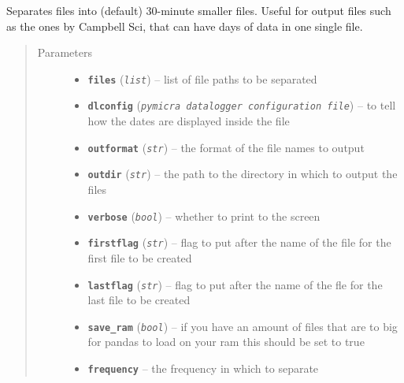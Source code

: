 \documentclass[a4paper,10pt,oneside]{sphinxmanual}
\begin{document}
\begin{fulllineitems}
\label{pymicra:pymicra.util.separateFiles}
Separates files into (default) 30-minute smaller files. Useful for output files such
as the ones by Campbell Sci, that can have days of data in one single file.
\begin{quote}\begin{description}
\item[{Parameters}] \leavevmode\begin{itemize}
\item {} 
\textbf{\texttt{files}} (\emph{\texttt{list}}) -- list of file paths to be separated

\item {} 
\textbf{\texttt{dlconfig}} (\emph{\texttt{pymicra datalogger configuration file}}) -- to tell how the dates are displayed inside the file

\item {} 
\textbf{\texttt{outformat}} (\emph{\texttt{str}}) -- the format of the file names to output

\item {} 
\textbf{\texttt{outdir}} (\emph{\texttt{str}}) -- the path to the directory in which to output the files

\item {} 
\textbf{\texttt{verbose}} (\emph{\texttt{bool}}) -- whether to print to the screen

\item {} 
\textbf{\texttt{firstflag}} (\emph{\texttt{str}}) -- flag to put after the name of the file for the first file to be created

\item {} 
\textbf{\texttt{lastflag}} (\emph{\texttt{str}}) -- flag to put after the name of the fle for the last file to be created

\item {} 
\textbf{\texttt{save\_ram}} (\emph{\texttt{bool}}) -- if you have an amount of files that are to big for pandas to load on your ram this should be set to true

\item {} 
\textbf{\texttt{frequency}} -- the frequency in which to separate


\end{itemize}
\end{description}
\end{quote}
\end{fulllineitems}
\end{document}
